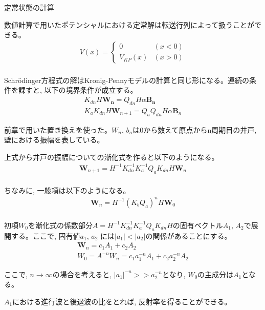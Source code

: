 \documentclass[a4paper, lualatex]{bxjsarticle}
\begin{document}
\begin{section}{定常状態の計算\label{AppT}}
    \par 数値計算で用いたポテンシャルにおける定常解は転送行列によって扱うことができる。
    \begin{align}
     V(x)=\begin{cases}0&(x<0)\\V_{KP}(x)&(x>0)\end{cases}\nonumber\\
    \end{align}
    \par Schrödinger方程式の解はKronig-Pennyモデルの計算と同じ形になる。連続の条件を課すと, 以下の境界条件が成立する。
    \begin{align}
     K_{dn} H \mathbf{W_n} = Q_{dn} H \alpha \mathbf{B_n}\nonumber\\
        K_{a} K_{dn} H \mathbf{W}_{n+1} = Q_a Q_{dn} H \alpha \mathbf{B}_n
    \end{align}
    \par 前章で用いた置き換えを使った。$W_n$, $b_n$は0から数えて原点からn周期目の井戸, 壁における振幅を表している。
    \par 上式から井戸の振幅についての漸化式を作ると以下のようになる。
    \begin{align}
     \mathbf{W}_{n+1}= H^{-1} K_{dn}^{-1} K_a^{-1} Q_a K_{dn} H \mathbf{W}_n\nonumber\\
    \end{align}
    \par ちなみに, 一般項は以下のようになる。
    \begin{align}
     \mathbf{W}_n = H^{-1} \left( K_b Q_a \right)^n H \mathbf{W}_0\nonumber\\
    \end{align}
    \par 初項$W_0$を漸化式の係数部分$A = H^{-1} K_{dn}^{-1} K_a^{-1} Q_a K_{dn} H$の固有ベクトル$A_1$, $A_2$で展開する。ここで, 固有値$a_1$, $a_2$ には$|a_1|<|a_2|$の関係があることにする。
    \begin{align}
     \mathbf{W}_n = c_1 A_1 + c_2 A_2\nonumber\\
      W_0 = A^{-n} W_n = c_1 a_1^{-n} A_1 + c_2 a_2^{-n} A_2
    \end{align}
    \par ここで, $n \rightarrow \infty$の場合を考えると, $|a_1|^{-n}>>a_2^{-n}$となり, $W_0$の主成分は$A_1$となる。
    \par $A_1$における進行波と後退波の比をとれば, 反射率を得ることができる。
\end{section}
\end{document}
